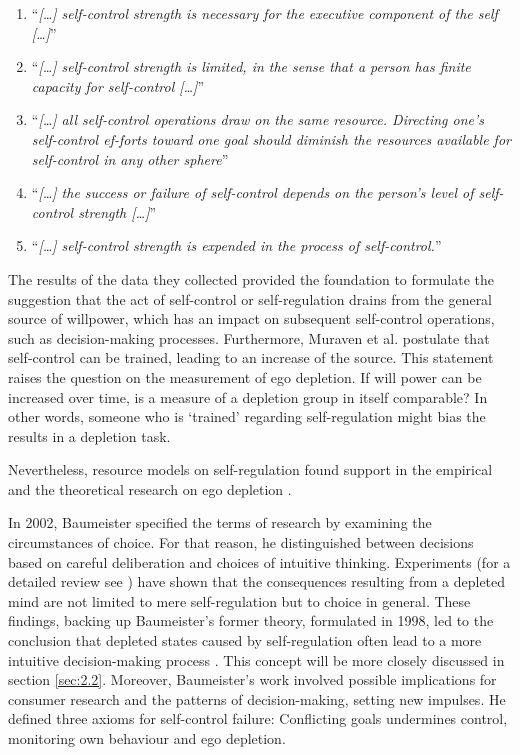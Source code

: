 \begin{enumerate}
\item “\emph{[\ldots] self-control strength is necessary for the executive component of the self [\ldots]}” \citep[p.~248]{muraven2000self}
\item “\emph{[\ldots] self-control strength is limited, in the sense that a person has finite capacity for self-control [\ldots]}” \citep[p.~248]{muraven2000self}
\item “\emph{[\ldots] all self-control operations draw on the same resource. Directing one's self-control ef-forts toward one goal should diminish the resources available for self-control in any other sphere}” \citep[p.~248]{muraven2000self}
\item “\emph{[\ldots] the success or failure of self-control depends on the person's level of self-control strength [\ldots]}” \citep[p.~248]{muraven2000self}
\item “\emph{[\ldots] self-control strength is expended in the process of self-control.}” \citep[p.~248]{muraven2000self}
\end{enumerate}
The results of the data they collected provided the foundation to formulate the suggestion that the act of self-control or self-regulation drains from the general source of willpower, which has an impact on subsequent self-control operations, such as decision-making processes. Furthermore, Muraven et al. postulate that self-control can be trained, leading to an increase of the source. This statement raises the question on the measurement of ego depletion. If will power can be increased over time, is a measure of a depletion group in itself comparable? In other words, someone who is ‘trained’ regarding self-regulation might bias the results in a depletion task.\par
Nevertheless, resource models on self-regulation found support in the empirical and the theoretical research on ego depletion \citep{mischel1996good,gross1998emerging,vohs2000self} .\par
In 2002, Baumeister \citep{baumeister2002yielding}  specified the terms of research by examining the circumstances of choice. For that reason, he distinguished between decisions based on careful deliberation and choices of intuitive thinking. Experiments (for a detailed review see \cite{vohs2000self}) have shown that the consequences resulting from a depleted mind are not limited to mere self-regulation but to choice in general. These findings, backing up Baumeister’s former theory, formulated in 1998, led to the conclusion that depleted states caused by self-regulation often lead to a more intuitive decision-making process \citep{pocheptsova2009deciding}. This concept will be more closely discussed in section \ref{sec:2.2}. Moreover, Baumeister’s work involved possible implications for consumer research and the patterns of decision-making, setting new impulses. He defined three axioms for self-control failure: Conflicting goals undermines control, monitoring own behaviour and ego depletion. \par
